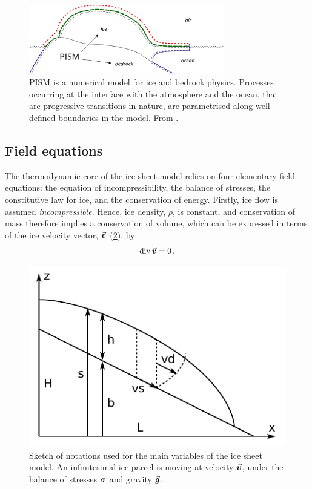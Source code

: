 \documentclass{article}
\newcommand{\todo}[1]{} %
\newcommand{\vect}[1]{\va*{#1}} %
\newcommand{\tens}[1]{\vb*{#1}} %
\renewcommand{\div}[1]{\mathrm{div}\,#1}            %
\newcommand{\CST}[0]{\tens{\sigma}}     %
\newcommand{\vv}[0]{\vect{v}}           %
\begin{document}
\begin{figure}
  \centering
  \includegraphics[width=85mm]{model-interfaces}
  \caption{PISM is a numerical model for ice and bedrock physics. Processes
           occurring at the interface with the atmosphere and the ocean, that
           are progressive transitions in nature, are parametrised along
           well-defined boundaries in the model.
           From \citet{PISM-authors.2014}.
           \todo{replace air by atmosphere.}}
  \label{fig:model-interfaces}
\end{figure}

\subsection{Field equations}

The thermodynamic core of the ice sheet model relies on four elementary field
equations: the equation of incompressibility, the balance of stresses, the constitutive law for ice, and the conservation of energy. Firstly, ice flow is assumed \emph{incompressible}. Hence, ice
density, $\rho$, is constant, and
conservation of mass therefore implies a conservation of volume, which can be expressed
in terms of the ice velocity vector, $\vv$ (\cref{fig:model-variables}), by
\begin{equation}
    \label{eqn:incompressibility}
    \div{\vv} = 0 \,.
\end{equation}

\begin{figure}
  \centering
  \includegraphics{model-variables}
  \caption{Sketch of notations used for the main variables of the ice sheet
           model. An infinitesimal ice parcel is moving at velocity $\vv$,
           under the balance of stresses $\CST$ and gravity $\vect{g}$.}
  \label{fig:model-variables}
\end{figure}
\end{document}
